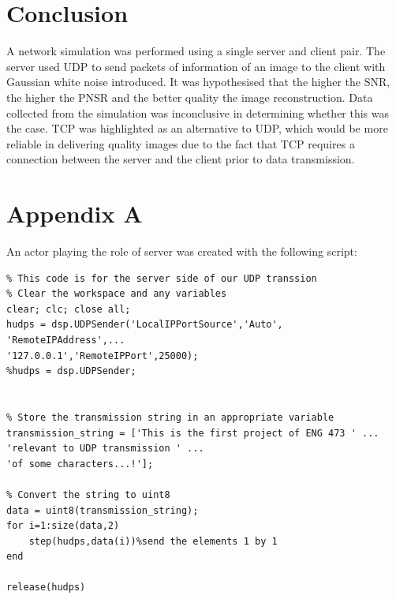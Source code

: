 \documentclass{article}
\begin{document}

\section{Conclusion}

A network simulation was performed using a single server and client pair. The server used UDP to send packets of information of an image to the client with Gaussian white noise introduced. It was hypothesised that the higher the SNR, the higher the PNSR and the better quality the image reconstruction. Data collected from the simulation was inconclusive in determining whether this was the case. TCP was highlighted as an alternative to UDP, which would be more reliable in delivering quality images due to the fact that TCP requires a connection between the server and the client prior to data transmission. 

\newpage


\section{Appendix A}

An actor playing the role of server was created with the following script:

\begin{lstlisting}
% This code is for the server side of our UDP transsion
% Clear the workspace and any variables
clear; clc; close all;
hudps = dsp.UDPSender('LocalIPPortSource','Auto', 'RemoteIPAddress',...
'127.0.0.1','RemoteIPPort',25000);
%hudps = dsp.UDPSender;


% Store the transmission string in an appropriate variable
transmission_string = ['This is the first project of ENG 473 ' ...
'relevant to UDP transmission ' ...
'of some characters...!'];

% Convert the string to uint8
data = uint8(transmission_string);
for i=1:size(data,2)
	step(hudps,data(i))%send the elements 1 by 1
end

release(hudps)
\end{lstlisting}
\end{document}
